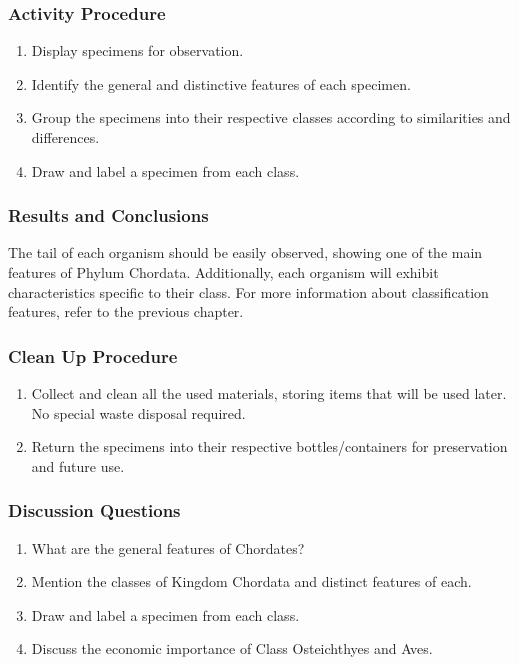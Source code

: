 \subsubsection*{Activity Procedure}
\begin{enumerate}
\item{Display specimens for observation.}
\item{Identify the general and distinctive features of each specimen.}
\item{Group the specimens into their respective classes according to similarities and differences.}
\item{Draw and label a specimen from each class.}
\end{enumerate}

\subsubsection*{Results and Conclusions}
The tail of each organism should be easily observed, showing one of the main features of Phylum Chordata. Additionally, each organism will exhibit characteristics specific to their class. For more information about classification features, refer to the previous chapter.

\subsubsection*{Clean Up Procedure}
\begin{enumerate}
\item{Collect and clean all the used materials, storing items that will be used later. No special waste disposal required.}
\item{Return the specimens into their respective bottles/containers for preservation and future use.}
\end{enumerate}

\subsubsection*{Discussion Questions}
\begin{enumerate}
\item{What are the general features of Chordates?}
\item{Mention the classes of Kingdom Chordata and distinct features of each.}
\item{Draw and label a specimen from each class.}
\item{Discuss the economic importance of Class Osteichthyes and Aves.}
\end{enumerate}

